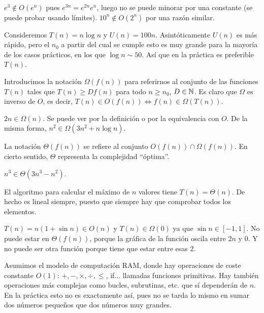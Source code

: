 \documentclass[AL.tex]{subfiles}
\begin{document}
\begin{ej}
$e^{3}\notin O (e^n)$ pues $e^{3n}=e^{2n}e^n$, luego no se puede minorar por una constante (se puede probar usando límites). $10^n\notin O(2^n)$ por una razón similar. 
\end{ej}

\begin{ej}
Consideremos $T(n)=n\log n$ y $U(n)=100n$. Asintóticamente $U(n)$ es más rápido, pero el $n_0$ a partir del cual se cumple esto es muy grande para la mayoría de los casos prácticos, en los que $\log n\sim 50$. Así que en la práctica es preferible $T(n)$.
\end{ej}

Introducimos la notación $\Omega(f(n))$ para referirnos al conjunto de las funciones $T(n)$ tales que $T(n)\geq Df(n)$ para todo $n\geq n_0$, $D\in\mathbb{N}$. Es claro que $\Omega$ es inverso de $O$, es decir, $T(n)\in O(f(n))\Leftrightarrow f(n)\in\Omega(T(n))$.

\begin{ej}
$2n\in\Omega(n)$. Se puede ver por la definición o por la equivalencia con $O$. De la misma forma, $n^2\in\Omega(3n^2+n\log n)$. 
\end{ej}

La notación $\Theta(f(n))$ se refiere al conjunto $O(f(n))\cap\Omega(f(n))$. En cierto sentido, $\Theta$ representa la complejidad ``óptima''.

\begin{ej}
$n^3\in\Theta(3n^3-n^2)$. 
\end{ej}

\begin{ej}
El algoritmo para calcular el máximo de $n$ valores tiene $T(n)=\Theta(n)$. De hecho es lineal siempre, puesto que siempre hay que comprobar todos los elementos. 
\end{ej}

\begin{ej}
$T(n)=n(1+\sin n)\in O(n)$ y $T(n)\in\Omega(0)$ ya que $\sin n\in [-1,1]$. No puede estar en $\Theta(f(n))$, porque la gráfica de la función oscila entre $2n$ y 0. Y no puede ser otra función porque tiene que estar entre esas 2. 
\end{ej}

\begin{nota}
Asumimos el modelo de computación RAM, donde hay operaciones de coste constante $O(1)$: $+,-,\times, \div, \leq$, if... llamadas funciones primitivas. Hay también operaciones más complejas como bucles, subrutinas, etc. que sí dependerán de $n$. En la práctica esto no es exactamente así, pues no se tarda lo mismo en sumar dos números pequeños que dos números muy grandes. 
\end{nota}
\end{document}
